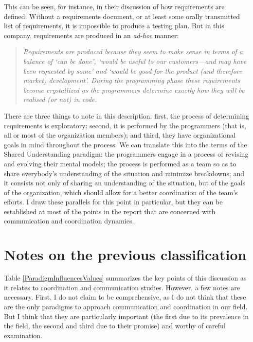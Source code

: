 This can be seen, for instance, in their discussion of how requirements are defined. Without a requirements document, or at least some orally transmitted list of requirements, it is impossible to produce a testing plan. But in this company, requirements are produced in an \emph{ad-hoc} manner:

\begin{quote}
\emph{Requirements are produced because they seem to make sense in terms of a balance of `can be done', `would be useful to our customers---and may have been requested by some' and `would be good for the product (and therefore market) development'. During the programming phase these requirements become crystallized as the programmers determine exactly how they will be realised (or not) in code.}
\end{quote}

There are three things to note in this description: first, the process of determining requirements is exploratory; second, it is performed by the programmers (that is, all or most of the organization members); and third, they have organizational goals in mind throughout the process. We can translate this into the terms of the Shared Understanding paradigm: the programmers engage in a process of revising and evolving their mental models; the process is performed as a team so as to share everybody's understanding of the situation and minimize breakdowns; and it consists not only of sharing an understanding of the situation, but of the goals of the organization, which should allow for a better coordination of the team's efforts. I draw these parallels for this point in particular, but they can be established at most of the points in the report that are concerned with communication and coordination dynamics.



\section{Notes on the previous classification}

Table \ref{ParadigmInfluencesValues} summarizes the key points of this discussion as it relates to coordination and communication studies. However, a few notes are necessary. First, I do not claim to be comprehensive, as I do not think that these are the only paradigms to approach communication and coordination in our field. But I think that they are particularly important (the first due to its prevalence in the field, the second and third due to their promise) and worthy of careful examination.

